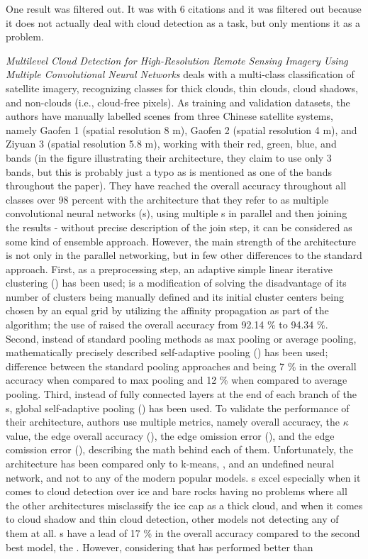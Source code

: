 One result was filtered out. It was \cite{center-pivot-remote-sensing} with 6 citations and it was filtered out because it does not actually deal with cloud detection as a task, but only mentions it as a problem.

\textit{Multilevel Cloud Detection for High-Resolution Remote Sensing Imagery Using Multiple Convolutional Neural Networks} deals with a multi-class classification of satellite imagery, recognizing classes for thick clouds, thin clouds, cloud shadows, and non-clouds (i.e., cloud-free pixels). As training and validation datasets, the authors have manually labelled scenes from three Chinese satellite systems, namely Gaofen 1 (spatial resolution 8 m), Gaofen 2 (spatial resolution 4 m), and Ziyuan 3 (spatial resolution 5.8 m), working with their red, green, blue, and  bands (in the figure illustrating their architecture, they claim to use only 3 bands, but this is probably just a typo as  is mentioned as one of the bands throughout the paper). They have reached the overall accuracy throughout all classes over 98 percent with the architecture that they refer to as multiple convolutional neural networks (s), using multiple s in parallel and then joining the results - without precise description of the join step, it can be considered as some kind of ensemble approach. However, the main strength of the architecture is not only in the parallel networking, but in few other differences to the standard approach. First, as a preprocessing step, an adaptive simple linear iterative clustering () has been used;  is a modification of  \cite{slic} solving the disadvantage of its number of clusters being manually defined and its initial cluster centers being chosen by an equal grid by utilizing the affinity propagation as part of the algorithm; the use of  raised the overall accuracy from 92.14 \% to 94.34 \%. Second, instead of standard pooling methods as max pooling or average pooling, mathematically precisely described self-adaptive pooling () has been used; difference between the standard pooling approaches and  being 7 \% in the overall accuracy when compared to max pooling and 12 \% when compared to average pooling. Third, instead of fully connected layers at the end of each branch of the s, global self-adaptive pooling () has been used. To validate the performance of their architecture, authors use multiple metrics, namely overall accuracy, the $\kappa$ value, the edge overall accuracy (), the edge omission error (), and the edge comission error (), describing the math behind each of them. Unfortunately, the architecture has been compared only to k-means, , and an undefined neural network, and not to any of the modern popular models. s excel especially when it comes to cloud detection over ice and bare rocks having no problems where all the other architectures misclassify the ice cap as a thick cloud, and when it comes to cloud shadow and thin cloud detection, other models not detecting any of them at all. s have a lead of 17 \% in the overall accuracy compared to the second best model, the . However, considering that  has performed better than 